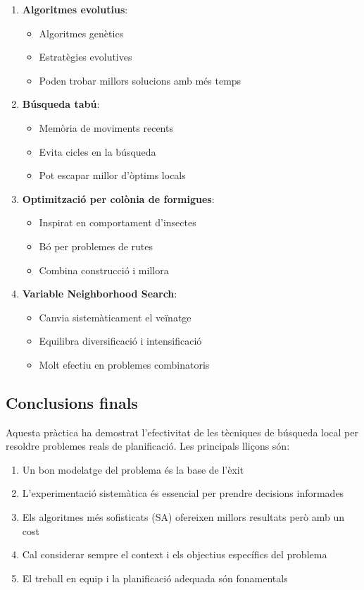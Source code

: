 \begin{enumerate}
    \item \textbf{Algoritmes evolutius}:
    \begin{itemize}
        \item Algoritmes genètics
        \item Estratègies evolutives
        \item Poden trobar millors solucions amb més temps
    \end{itemize}
    
    \item \textbf{Búsqueda tabú}:
    \begin{itemize}
        \item Memòria de moviments recents
        \item Evita cicles en la búsqueda
        \item Pot escapar millor d'òptims locals
    \end{itemize}
    
    \item \textbf{Optimització per colònia de formigues}:
    \begin{itemize}
        \item Inspirat en comportament d'insectes
        \item Bó per problemes de rutes
        \item Combina construcció i millora
    \end{itemize}
    
    \item \textbf{Variable Neighborhood Search}:
    \begin{itemize}
        \item Canvia sistemàticament el veïnatge
        \item Equilibra diversificació i intensificació
        \item Molt efectiu en problemes combinatoris
    \end{itemize}
\end{enumerate}

\subsection{Conclusions finals}

Aquesta pràctica ha demostrat l'efectivitat de les tècniques de búsqueda local per resoldre problemes reals de planificació. Les principals lliçons són:

\begin{enumerate}
    \item Un bon modelatge del problema és la base de l'èxit
    \item L'experimentació sistemàtica és essencial per prendre decisions informades
    \item Els algoritmes més sofisticats (SA) ofereixen millors resultats però amb un cost
    \item Cal considerar sempre el context i els objectius específics del problema
    \item El treball en equip i la planificació adequada són fonamentals
\end{enumerate}

